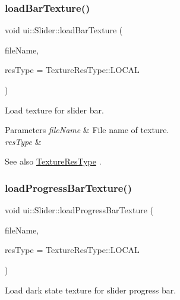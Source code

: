 \subsubsection{\texorpdfstring{load\+Bar\+Texture()}{loadBarTexture()}\hspace{0.1cm}{\footnotesize\ttfamily [2/2]}}
{\footnotesize\ttfamily void ui\+::\+Slider\+::load\+Bar\+Texture (\begin{DoxyParamCaption}\item[{const std\+::string \&}]{file\+Name,  }\item[{\hyperlink{classui_1_1Widget_a040a65ec5ad3b11119b7e16b98bd9af0}{Texture\+Res\+Type}}]{res\+Type = {\ttfamily TextureResType\+:\+:LOCAL} }\end{DoxyParamCaption})}

Load texture for slider bar.


\begin{DoxyParams}{Parameters}
{\em file\+Name} & File name of texture. \\
\hline
{\em res\+Type} & \\
\hline
\end{DoxyParams}
\begin{DoxySeeAlso}{See also}
\hyperlink{classui_1_1Widget_a040a65ec5ad3b11119b7e16b98bd9af0}{Texture\+Res\+Type} . 
\end{DoxySeeAlso}
\mbox{\label{classui_1_1Slider_a7d4ee10a1661d3ca873288b92600dc54}} 
\subsubsection{\texorpdfstring{load\+Progress\+Bar\+Texture()}{loadProgressBarTexture()}\hspace{0.1cm}{\footnotesize\ttfamily [1/2]}}
{\footnotesize\ttfamily void ui\+::\+Slider\+::load\+Progress\+Bar\+Texture (\begin{DoxyParamCaption}\item[{const std\+::string \&}]{file\+Name,  }\item[{\hyperlink{classui_1_1Widget_a040a65ec5ad3b11119b7e16b98bd9af0}{Texture\+Res\+Type}}]{res\+Type = {\ttfamily TextureResType\+:\+:LOCAL} }\end{DoxyParamCaption})}

Load dark state texture for slider progress bar.


